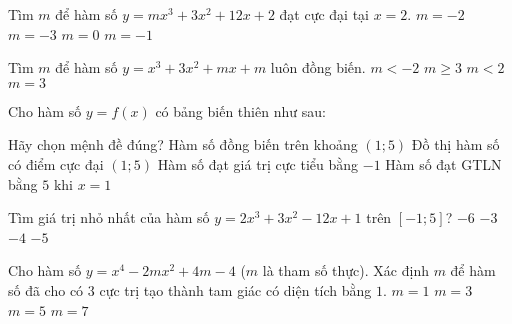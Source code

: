 \begin{ex}%
Tìm $m$ để hàm số $y=mx^3+3x^2+12x+2$ đạt cực đại tại $x=2$.
\choice
{\True $m=-2$}
{$m=-3$}
{$m=0$}
{$m=-1$}
\end{ex}

\begin{ex}%
Tìm $m$ để hàm số $y=x^3+3x^2+mx+m$ luôn đồng biến.
\choice
{$m<-2$}
{\True $m \geq 3$}
{$m<2$}
{$m=3$}
\end{ex}

\begin{ex}%
Cho hàm số $y=f(x)$ có bảng biến thiên như sau:
\begin{center}
\end{center}
Hãy chọn mệnh đề đúng?
\choice
{Hàm số đồng biến trên khoảng $(1;5)$}
{\True Đồ thị hàm số có điểm cực đại $(1;5)$}
{Hàm số đạt giá trị cực tiểu bằng $-1$}
{Hàm số đạt GTLN bằng $5$ khi $x=1$}
\end{ex}

\begin{ex}%
Tìm giá trị nhỏ nhất của hàm số $y=2x^3+3x^2-12x+1$ trên $[-1;5]$?
\choice
{\True $-6$}
{$-3$}
{$-4$}
{$-5$}
\end{ex}

\begin{ex}%
Cho hàm số $y=x^4-2mx^2+4m-4$ ($m$ là tham số thực). Xác định $m$ để hàm số đã cho có $3$ cực trị tạo thành tam giác có diện tích bằng $1$.
\choice
{\True $m=1$}
{$m=3$}
{$m=5$}
{$m=7$}
\end{ex}

